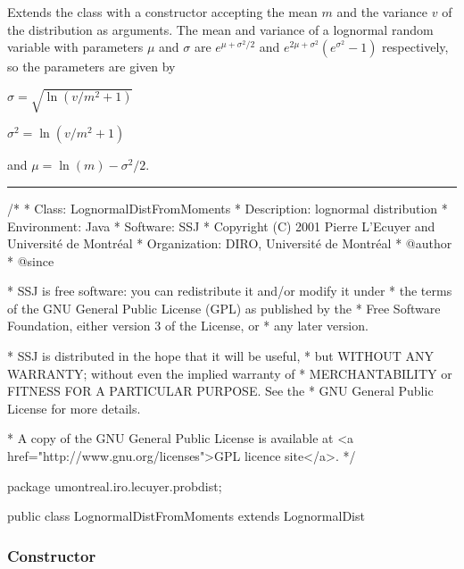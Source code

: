
Extends the  class with a constructor accepting the
mean $m$ and the variance $v$ of the distribution as arguments.
The mean and variance of a lognormal random variable with
parameters $\mu$ and $\sigma$ are
$e^{\mu+\sigma^2/2}$ and
$e^{2\mu + \sigma^2}(e^{\sigma^2} - 1)$ respectively, so
the parameters are given by
\begin{latexonly} $\sigma=\sqrt{\ln(v/m^2+1)}$ \end{latexonly}
\begin{htmlonly}  $\sigma^2={\ln(v/m^2+1)}$ \end{htmlonly}
and
$\mu=\ln(m) - \sigma^2/2$.

\bigskip\hrule\bigskip

\begin{code}
\begin{hide}
/*
 * Class:        LognormalDistFromMoments
 * Description:  lognormal distribution
 * Environment:  Java
 * Software:     SSJ 
 * Copyright (C) 2001  Pierre L'Ecuyer and Université de Montréal
 * Organization: DIRO, Université de Montréal
 * @author       
 * @since

 * SSJ is free software: you can redistribute it and/or modify it under
 * the terms of the GNU General Public License (GPL) as published by the
 * Free Software Foundation, either version 3 of the License, or
 * any later version.

 * SSJ is distributed in the hope that it will be useful,
 * but WITHOUT ANY WARRANTY; without even the implied warranty of
 * MERCHANTABILITY or FITNESS FOR A PARTICULAR PURPOSE.  See the
 * GNU General Public License for more details.

 * A copy of the GNU General Public License is available at
   <a href="http://www.gnu.org/licenses">GPL licence site</a>.
 */
\end{hide}
package umontreal.iro.lecuyer.probdist;


public class LognormalDistFromMoments extends LognormalDist\begin{hide} {
\end{hide}
\end{code}


\subsubsection* {Constructor}


